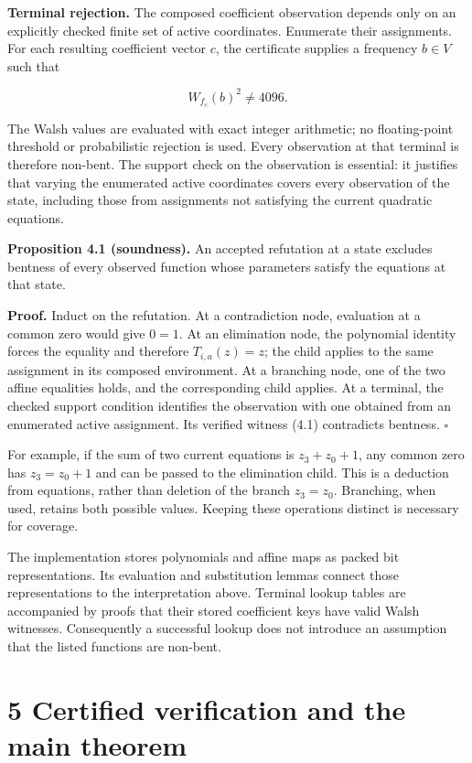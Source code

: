 \documentclass[pdflatex,sn-mathphys-num]{sn-jnl}
\begin{document}
\textbf{Terminal rejection.} The composed coefficient observation depends only on an explicitly checked finite set of active coordinates. Enumerate their assignments. For each resulting coefficient vector $c$, the certificate supplies a frequency $b\in V$ such that

\[
W_{f_c}(b)^2\ne4096. \tag{4.1}
\]

The Walsh values are evaluated with exact integer arithmetic; no floating-point threshold or probabilistic rejection is used. Every observation at that terminal is therefore non-bent. The support check on the observation is essential: it justifies that varying the enumerated active coordinates covers every observation of the state, including those from assignments not satisfying the current quadratic equations.

\textbf{Proposition 4.1 (soundness).} An accepted refutation at a state excludes bentness of every observed function whose parameters satisfy the equations at that state.

\textbf{Proof.} Induct on the refutation. At a contradiction node, evaluation at a common zero would give $0=1$. At an elimination node, the polynomial identity forces the equality and therefore $T_{i,a}(z)=z$; the child applies to the same assignment in its composed environment. At a branching node, one of the two affine equalities holds, and the corresponding child applies. At a terminal, the checked support condition identifies the observation with one obtained from an enumerated active assignment. Its verified witness (4.1) contradicts bentness. \hfill$\square$

For example, if the sum of two current equations is $z_3+z_0+1$, any common zero has $z_3=z_0+1$ and can be passed to the elimination child. This is a deduction from equations, rather than deletion of the branch $z_3=z_0$. Branching, when used, retains both possible values. Keeping these operations distinct is necessary for coverage.

The implementation stores polynomials and affine maps as packed bit representations. Its evaluation and substitution lemmas connect those representations to the interpretation above. Terminal lookup tables are accompanied by proofs that their stored coefficient keys have valid Walsh witnesses. Consequently a successful lookup does not introduce an assumption that the listed functions are non-bent.

\section*{5 Certified verification and the main theorem}
\end{document}
